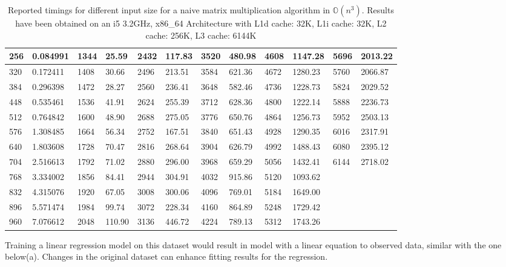 \begin{table}[H]
\begin{center}
{\begin{tabular}{|l|l|l|l|l|l|l|l|l|l|l|l|}
                256 & 0.084991 & 1344 & 25.59 & 2432 & 117.83 & 3520 & 480.98 & 4608 & 1147.28 & 5696 & 2013.22 \\ \hline
                320 & 0.172411 & 1408 & 30.66 & 2496 & 213.51 & 3584 & 621.36 & 4672 & 1280.23 & 5760 & 2066.87 \\ \hline
                384 & 0.296398 & 1472 & 28.27 & 2560 & 236.41 & 3648 & 582.46 & 4736 & 1228.73 & 5824 & 2029.52 \\ \hline
                448 & 0.535461 & 1536 & 41.91 & 2624 & 255.39 & 3712 & 628.36 & 4800 & 1222.14 & 5888 & 2236.73 \\ \hline
                512 & 0.764842 & 1600 & 48.90 & 2688 & 275.05 & 3776 & 650.76 & 4864 & 1256.73 & 5952 & 2503.13 \\ \hline
                576 & 1.308485 & 1664 & 56.34 & 2752 & 167.51 & 3840 & 651.43 & 4928 & 1290.35 & 6016 & 2317.91 \\ \hline
                640 & 1.803608 & 1728 & 70.47 & 2816 & 268.64 & 3904 & 626.79 & 4992 & 1488.43 & 6080 & 2395.12 \\ \hline
                704 & 2.516613 & 1792 & 71.02 & 2880 & 296.00 & 3968 & 659.29 & 5056 & 1432.41 & 6144 & 2718.02 \\ \hline
                768 & 3.334002 & 1856 & 84.41 & 2944 & 304.91 & 4032 & 915.86 & 5120 & 1093.62 & &         \\ \hline
                832 & 4.315076 & 1920 & 67.05 & 3008 & 300.06 & 4096 & 769.01 & 5184 & 1649.00 & &         \\ \hline
                896 & 5.571474 & 1984 & 99.74 & 3072 & 228.34 & 4160 & 864.89 & 5248 & 1729.42 & &         \\ \hline
                960 & 7.076612 & 2048 & 110.90 & 3136 & 446.72 & 4224 & 789.13 & 5312 & 1743.26 & &         \\ \hline
            \end{tabular}
        }
    \end{center}
    \caption{Reported timings for different input size for a naive matrix multiplication algorithm in $\mathbb{O}(n^{3})$. Results have been obtained on an i5 3.2GHz, x86\_64 Architecture with L1d cache: 32K, L1i cache: 32K, L2 cache: 256K, L3 cache: 6144K}
\end{table}

Training a linear regression model on this dataset would result in model with a linear equation to observed data, similar with the one below(a). Changes in the original dataset can enhance fitting results for the regression.

